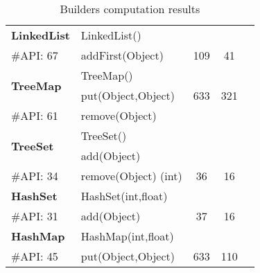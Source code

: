 \begin{table}[t!]
{\begin{tabular}{l l ccc}
\hline

\multirow{1}{*}{\textbf{LinkedList}} 
 & LinkedList()& &\\
 {\scriptsize \#API: 67}&  addFirst(Object) &109   &41 \\
 \hline

\multirow{2}{*}{\textbf{TreeMap}} 
 & TreeMap()& &\\
 & put(Object,Object) & 633 & 321 \\
{\scriptsize \#API: 61}&  remove(Object) & &\\
\hline

\multirow{2}{*}{\textbf{TreeSet}} 
 & TreeSet()& &\\
 & add(Object) &   & \\
{\scriptsize \#API: 34}&  remove(Object) (int) & 36 & 16\\
\hline

\multirow{1}{*}{\textbf{HashSet}} 
 & HashSet(int,float)& &\\
 {\scriptsize \#API: 31}&  add(Object) & 37  &16 \\
\hline

\multirow{1}{*}{\textbf{HashMap}} 
 & HashMap(int,float)& &\\
{\scriptsize \#API: 45}& put(Object,Object) &  633 &110 \\
\hline

\end{tabular}%
}

\caption{Builders computation results}
\label{tab:results-compute-bld}
\end{table}

\hspace{1cm}

